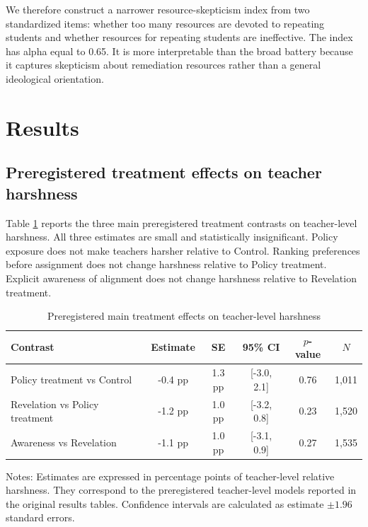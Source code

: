 \documentclass[12pt,a4paper]{article}
\newcommand{\ci}[2]{[#1, #2]}
\begin{document}
We therefore construct a narrower resource-skepticism index from two standardized items: whether too many resources are devoted to repeating students and whether resources for repeating students are ineffective. The index has alpha equal to 0.65. It is more interpretable than the broad battery because it captures skepticism about remediation resources rather than a general ideological orientation.

\section{Results}

\subsection{Preregistered treatment effects on teacher harshness}

Table \ref{tab:main_prereg} reports the three main preregistered treatment contrasts on teacher-level harshness. All three estimates are small and statistically insignificant. Policy exposure does not make teachers harsher relative to Control. Ranking preferences before assignment does not change harshness relative to Policy treatment. Explicit awareness of alignment does not change harshness relative to Revelation treatment.

\begin{table}[!htbp]
\centering
\caption{Preregistered main treatment effects on teacher-level harshness}
\label{tab:main_prereg}
\begin{threeparttable}
\begin{tabular}{lccccc}
\toprule
Contrast & Estimate & SE & 95\% CI & \(p\)-value & \(N\) \\
\midrule
Policy treatment vs Control & -0.4 pp & 1.3 pp & \ci{-3.0}{2.1} & 0.76 & 1,011 \\
Revelation vs Policy treatment & -1.2 pp & 1.0 pp & \ci{-3.2}{0.8} & 0.23 & 1,520 \\
Awareness vs Revelation & -1.1 pp & 1.0 pp & \ci{-3.1}{0.9} & 0.27 & 1,535 \\
\bottomrule
\end{tabular}
\begin{tablenotes}[flushleft]
\footnotesize
\item Notes: Estimates are expressed in percentage points of teacher-level relative harshness. They correspond to the preregistered teacher-level models reported in the original results tables. Confidence intervals are calculated as estimate \(\pm 1.96\) standard errors.
\end{tablenotes}
\end{threeparttable}
\end{table}
\end{document}
